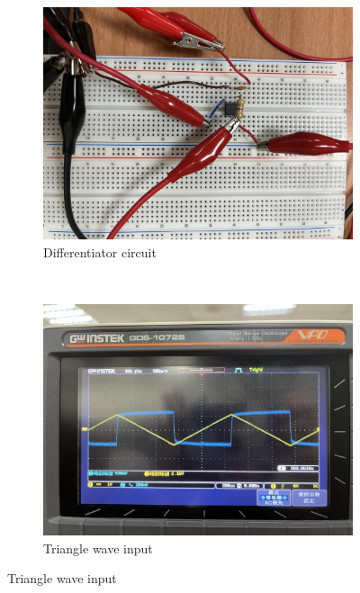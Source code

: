 \documentclass{article}
\begin{document}
\begin{CJK*}{UTF8}{bkai}
\begin{figure}[h]
    \begin{center}
    
        \begin{subfigure}[b]{0.2\textwidth}
            \includegraphics[width=\textwidth]{diff_circuit.jpg}
            \caption{Differentiator circuit}
        \end{subfigure}
        ~
        \begin{subfigure}[b]{0.3\textwidth}
            \includegraphics[width=\textwidth]{diff_trig.jpg}
            \caption{Triangle wave input}
        \end{subfigure}
    

\end{center}
\end{figure}
\end{CJK*}
\end{document}
